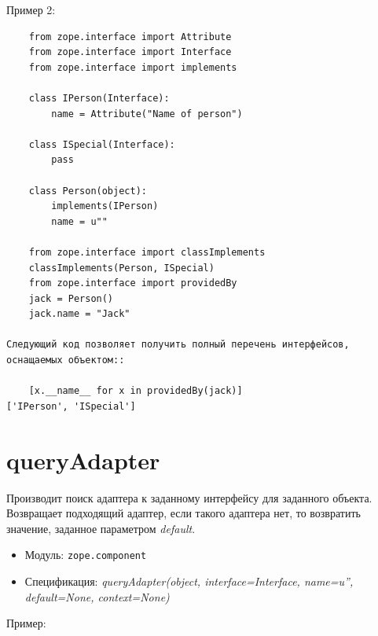 \documentclass[a4paper,openany,twoside,final]{book}
\providecommand*{\DUroletitlereference}[1]{\textsl{#1}}
\begin{document}
Пример 2:

\begin{verbatim}
    from zope.interface import Attribute
    from zope.interface import Interface
    from zope.interface import implements

    class IPerson(Interface):
        name = Attribute("Name of person")

    class ISpecial(Interface):
        pass

    class Person(object):
        implements(IPerson)
        name = u""

    from zope.interface import classImplements
    classImplements(Person, ISpecial)
    from zope.interface import providedBy
    jack = Person()
    jack.name = "Jack"

Следующий код позволяет получить полный перечень интерфейсов,
оснащаемых объектом::

    [x.__name__ for x in providedBy(jack)]
['IPerson', 'ISpecial']
\end{verbatim}


\section*{queryAdapter%
  \label{queryadapter}%
}

Производит поиск адаптера к заданному интерфейсу для заданного объекта.  Возвращает подходящий адаптер, если такого адаптера нет, то возвратить значение, заданное параметром \DUroletitlereference{default}.

\begin{itemize}

\item Модуль: \texttt{zope.component}

\item Спецификация: \DUroletitlereference{queryAdapter(object, interface=Interface, name=u'', default=None, context=None)}

\end{itemize}

Пример:
\end{document}
